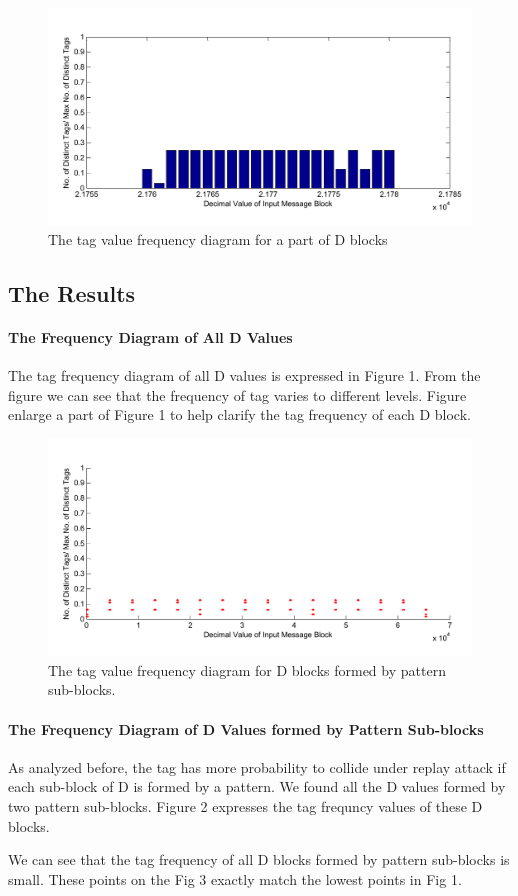 \documentclass{article}
\begin{document}
\begin{figure}[htbp]
 \centering
 \includegraphics[scale=0.4]{./frequency/portion_bar.pdf}
 \caption{The tag value frequency diagram for a part of D blocks}
 \label{fig:2 }
\end{figure} 


\subsection{The Results}
\paragraph{The Frequency Diagram of All D Values}
The tag frequency diagram of all D values is expressed in Figure 1. From the figure we can see that the frequency of tag varies to different levels. Figure enlarge a part of Figure 1 to help clarify the tag frequency of each D block. 

\begin{figure}[htbp]
 \centering
 \includegraphics[scale=0.4]{./frequency/pattern_frequency_spot.pdf}
 \caption{The tag value frequency diagram for D blocks formed by pattern sub-blocks. }
 \label{fig:3}
\end{figure}
\paragraph{The Frequency Diagram of D Values formed by Pattern Sub-blocks}
As analyzed before, the tag has more probability to collide under replay attack if each sub-block of D is formed by a pattern. We found all the D values formed by two pattern sub-blocks. Figure 2 expresses the tag frequncy values of these D blocks.

We can see that the tag frequency of all D blocks formed by pattern sub-blocks is small. These points on the Fig 3 exactly match the lowest points in Fig 1. 
\end{document}
